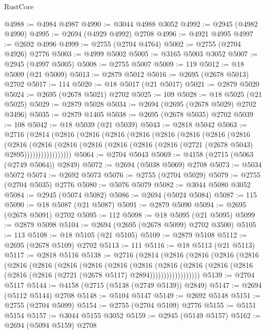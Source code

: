 \begin{lexlean}{RustCore}
\begin{coremodule}
@4988 := @4984 @4987
@4990 := @3044 @4988 @3052
@4992 := @2945 (@4982 @4990)
@4995 := @2694 (@4929 @4992) @2708
@4996 := @4921 @4995
@4997 := @2692 @4996
@4999 := @2755 (@2704 @4764)
@5002 := @2755 (@2704 @4926) @2776
@5003 := @4999 @5002
@5005 := @3165 @5003 @3052
@5007 := @2945 (@4997 @5005)
@5008 := @2755 @5007
@5009 := 119
@5012 := @18 @5009 (@21 @5009)
@5013 := @2879 @5012
@5016 := @2695 (@2678 @5013) @2702
@5017 := 114
@5020 := @18 @5017 (@21 @5017)
@5021 := @2879 @5020
@5024 := @2695 (@2678 @5021) @2702
@5025 := 109
@5028 := @18 @5025 (@21 @5025)
@5029 := @2879 @5028
@5034 := @2694 (@2695 (@2678 @5029) @2702 @3496)
@5035 := @2879 @1405
@5038 := @2695 (@2678 @5035) @2702
@5039 := 108
@5042 := @18 @5039 (@21 @5039)
@5043 := @2818 @5042
@5063 := @2716
    (@2814
      (@2816
        (@2816
          (@2816
            (@2816
              (@2816
                (@2816
                  (@2816
                    (@2816
                      (@2816
                        (@2816
                          (@2816
                            (@2816 (@2816 (@2816 (@2816 (@2721 (@2678 @5043) @2895)))))))))))))))))
@5064 := @2704 @5043
@5069 := @4158 (@2715 (@5063 (@2749 @5064)) @2849)
@5072 := @2694 (@5038 @5069) @2708
@5073 := @5034 @5072
@5074 := @2692 @5073
@5076 := @2755 (@2704 @5029)
@5079 := @2755 (@2704 @5035) @2776
@5080 := @5076 @5079
@5082 := @3044 @5080 @3052
@5084 := @2945 (@5074 @5082)
@5086 := @2694 (@5024 @5084)
@5087 := 115
@5090 := @18 @5087 (@21 @5087)
@5091 := @2879 @5090
@5094 := @2695 (@2678 @5091) @2702
@5095 := 112
@5098 := @18 @5095 (@21 @5095)
@5099 := @2879 @5098
@5104 := @2694 (@2695 (@2678 @5099) @2702 @3500)
@5105 := 113
@5108 := @18 @5105 (@21 @5105)
@5109 := @2879 @5108
@5112 := @2695 (@2678 @5109) @2702
@5113 := 111
@5116 := @18 @5113 (@21 @5113)
@5117 := @2818 @5116
@5138 := @2716
    (@2814
      (@2816
        (@2816
          (@2816
            (@2816
              (@2816
                (@2816
                  (@2816
                    (@2816
                      (@2816
                        (@2816
                          (@2816
                            (@2816
                              (@2816
                                (@2816 (@2816 (@2816 (@2721 (@2678 @5117) @2894))))))))))))))))))
@5139 := @2704 @5117
@5144 := @4158 (@2715 (@5138 (@2749 @5139)) @2849)
@5147 := @2694 (@5112 @5144) @2708
@5148 := @5104 @5147
@5149 := @2692 @5148
@5151 := @2755 (@2704 @5099)
@5154 := @2755 (@2704 @5109) @2776
@5155 := @5151 @5154
@5157 := @3044 @5155 @3052
@5159 := @2945 (@5149 @5157)
@5162 := @2694 (@5094 @5159) @2708

\end{coremodule}
\end{lexlean}
